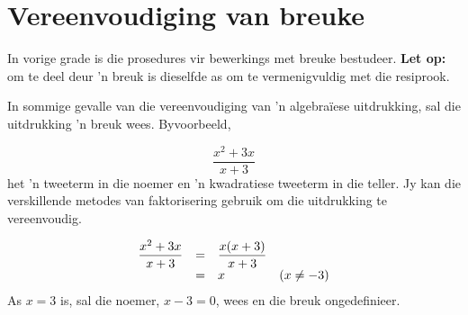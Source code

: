 \section{Vereenvoudiging van breuke}
\nopagebreak

In vorige grade is die prosedures vir bewerkings met breuke bestudeer.
\textbf{Let op:} om te deel deur 'n breuk is dieselfde as om te vermenigvuldig met die resiprook.\par

In sommige gevalle van die vereenvoudiging van ’n algebraïese uitdrukking, sal die uitdrukking ’n breuk wees. Byvoorbeeld,

\begin{equation*}
\dfrac{{x}^{2}+3x}{x+3}
\end{equation*}
het ’n tweeterm in die noemer en ’n kwadratiese tweeterm in die teller. Jy kan die verskillende metodes van faktorisering gebruik om die uitdrukking te vereenvoudig.\par 

\begin{equation*}
\begin{array}{llll} \dfrac{{x}^{2}+3x}{x+3}\hfill & =& \dfrac{x(x+3)}{x+3}\hfill & \\ & =& x\hfill & (x\neq -3)\hfill \end{array}
\end{equation*}
As $x = 3$ is, sal die noemer, $x-3 = 0$, wees en die breuk ongedefinieer.\par 


